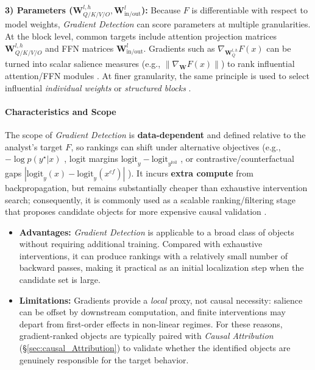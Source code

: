 \documentclass[11pt,letterpaper]{mystyle}
\begin{document}
\textbf{3) Parameters ($\mathbf{W}_{Q/K/V/O}^{l,h},  \mathbf{W}_{\text{in/out}}^l$):}
Because $F$ is differentiable with respect to model weights, \textit{Gradient Detection} can score parameters at multiple granularities.
At the block level, common targets include attention projection matrices $\mathbf{W}_{Q/K/V/O}^{l,h}$ and FFN matrices $\mathbf{W}_{\text{in/out}}^l$. 
Gradients such as $\nabla_{\mathbf{W}_{Q}^{l,h}}F(x)$ can be turned into scalar salience measures (e.g., $\|\nabla_{\mathbf{W}}F(x)\|$) to rank influential attention/FFN modules \citep{relp2025,gaf_acl2025,liu2025sensmerging}.
At finer granularity, the same principle is used to select influential \emph{individual weights} \citep{ircan_neurips2024,gmt2025} or \emph{structured blocks} \citep{zhang2024linguistic,li-etal-2025-loracoe}.

\paragraph{Characteristics and Scope}
The scope of \textit{Gradient Detection} is \textbf{data-dependent} and defined relative to the analyst's target $F$, so rankings can shift under alternative objectives (e.g., $-\log p(y^\star|x)$ \citep{zhang2024linguistic,gmt2025}, logit margins $\mathrm{logit}_y-\mathrm{logit}_{y^{\mathrm{foil}}}$ \citep{wang2022interpretability,zhang2023towards}, or contrastive/counterfactual gaps $|\mathrm{logit}_y(x)-\mathrm{logit}_y(x^{cf})|$ \citep{yin-neubig-2022-interpreting,ircan_neurips2024}). 
It incurs \textbf{extra compute} from backpropagation, but remains substantially cheaper than exhaustive intervention search; consequently, it is commonly used as a scalable ranking/filtering stage that proposes candidate objects for more expensive causal validation \citep{atpstar2403.00745}.

\begin{itemize}[leftmargin=*]
    \item \textbf{Advantages:}
    \textit{Gradient Detection} is applicable to a broad class of objects without requiring additional training.
    Compared with exhaustive interventions, it can produce rankings with a relatively small number of backward passes, making it practical as an initial localization step when the candidate set is large.

    \item \textbf{Limitations:}
    Gradients provide a \emph{local} proxy, not causal necessity: salience can be offset by downstream computation, and finite interventions may depart from first-order effects in non-linear regimes. 
    For these reasons, gradient-ranked objects are typically paired with \textit{Causal Attribution} (\S\ref{sec:causal_Attribution}) to validate whether the identified objects are genuinely responsible for the target behavior.
\end{itemize}
\end{document}

